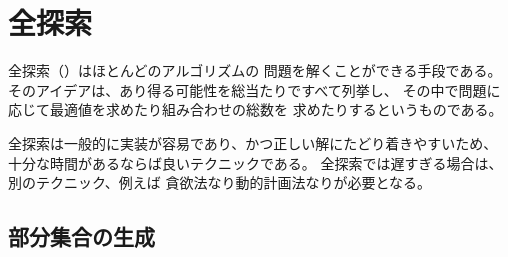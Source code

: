 \begin{comment}
\chapter{Complete search}

\key{Complete search}
is a general method that can be used
to solve almost any algorithm problem.
The idea is to generate all possible
solutions to the problem using brute force,
and then select the best solution or count the
number of solutions, depending on the problem.

Complete search is a good technique
if there is enough time to go through all the solutions,
because the search is usually easy to implement
and it always gives the correct answer.
If complete search is too slow,
other techniques, such as greedy algorithms or
dynamic programming, may be needed.
\end{comment}

\chapter{全探索}

全探索（）はほとんどのアルゴリズムの
問題を解くことができる手段である。
そのアイデアは、あり得る可能性を総当たりですべて列挙し、
その中で問題に応じて最適値を求めたり組み合わせの総数を
求めたりするというものである。

全探索は一般的に実装が容易であり、かつ正しい解にたどり着きやすいため、
十分な時間があるならば良いテクニックである。
全探索では遅すぎる場合は、別のテクニック、例えば
貪欲法なり動的計画法なりが必要となる。


\begin{comment}
\section{Generating subsets}

\index{subset}

We first consider the problem of generating
all subsets of a set of $n$ elements.
For example, the subsets of $\{0,1,2\}$ are
$\emptyset$, $\{0\}$, $\{1\}$, $\{2\}$, $\{0,1\}$,
$\{0,2\}$, $\{1,2\}$ and $\{0,1,2\}$.
There are two common methods to generate subsets:
we can either perform a recursive search
or exploit the bit representation of integers.
\end{comment}

\section{部分集合の生成}

